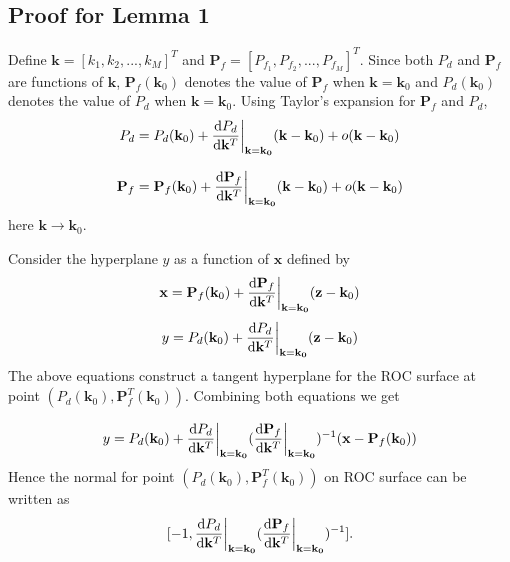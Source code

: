 \documentclass[12pt,journal,a4paper,twoside,onecolumn]{IEEEtran}
\begin{document}
\begin{spacing}{2.5}
\appendix
\subsection{Proof for Lemma 1}

Define $\mathbf{k} = [k_1, k_2, ..., k_M]^T$ and $\mathbf{P}_f = [P_{f_1}, P_{f_2}, ..., P_{f_M}]^T$. Since both $P_d$ and $\mathbf{P}_f$ are functions of $\mathbf{k}$, $\mathbf{P}_f(\mathbf{k}_0)$ denotes the value of $\mathbf{P}_f$ when $\mathbf{k} = \mathbf{k}_0$ and $P_d(\mathbf{k}_0)$ denotes the value of $P_d$ when $\mathbf{k} = \mathbf{k}_0$. Using Taylor's expansion for $\mathbf{P}_f$ and $P_d$,
\begin{equation}
\label{pro: pd}
P_d = P_d(\mathbf{k}_0) + \frac{\mathrm{d}P_d}{\mathrm{d}\mathbf{k}^T}\bigg{|}_{\mathbf{k}=\mathbf{k_0}}(\mathbf{k} - \mathbf{k}_0)
+ o(\mathbf{k} - \mathbf{k}_0)
\end{equation}

\begin{equation}
\label{pro: pf}
\mathbf{P}_f = \mathbf{P}_f(\mathbf{k}_0) + \frac{\mathrm{d}\mathbf{P}_f}{\mathrm{d}\mathbf{k}^T}\bigg{|}_{\mathbf{k}=\mathbf{k_0}}(\mathbf{k} - \mathbf{k}_0)
+ o(\mathbf{k} - \mathbf{k}_0)
\end{equation}
here $\mathbf{k} \rightarrow \mathbf{k}_0$.

Consider the hyperplane $y$ as a function of $\mathbf{x}$ defined by
\begin{equation}
\label{pro: x}
\mathbf{x} = \mathbf{P}_f(\mathbf{k}_0) + \frac{\mathrm{d}\mathbf{P}_f}{\mathrm{d}\mathbf{k}^T}\bigg{|}_{\mathbf{k}=\mathbf{k_0}}(\mathbf{z} - \mathbf{k}_0)
\end{equation}
\begin{equation}
\label{pro: y}
y = P_d(\mathbf{k}_0) + \frac{\mathrm{d}P_d}{\mathrm{d}\mathbf{k}^T}\bigg{|}_{\mathbf{k}=\mathbf{k_0}}(\mathbf{z} - \mathbf{k}_0)
\end{equation}
The above equations construct a tangent hyperplane for the ROC surface at point $(P_d(\mathbf{k}_0), \mathbf{P}_f^T(\mathbf{k}_0))$. Combining both equations  we get

\begin{equation}
\label{pro : y2}
y = P_d(\mathbf{k}_0) + \frac{\mathrm{d}P_d}{\mathrm{d}\mathbf{k}^T}\bigg{|}_{\mathbf{k}=\mathbf{k_0}}(
\frac{\mathrm{d}\mathbf{P}_f}{\mathrm{d}\mathbf{k}^T}\bigg{|}_{\mathbf{k}=\mathbf{k_0}}
)^{-1} (\mathbf{x} - \mathbf{P}_f(\mathbf{k}_0))
\end{equation}
Hence the normal for point $(P_d(\mathbf{k}_0), \mathbf{P}_f^T(\mathbf{k}_0))$ on ROC surface can be written as
\begin{equation}
\label{vec: normal}
[-1, \frac{\mathrm{d}P_d}{\mathrm{d}\mathbf{k}^T}\bigg{|}_{\mathbf{k}=\mathbf{k_0}}(
\frac{\mathrm{d}\mathbf{P}_f}{\mathrm{d}\mathbf{k}^T}\bigg{|}_{\mathbf{k}=\mathbf{k_0}}
)^{-1}
].
\end{equation}


\end{spacing}
\end{document}
